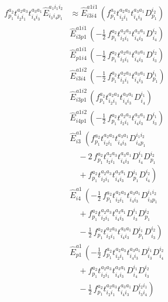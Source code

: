 \documentclass[11pt]{article}
\begin{document}
\begin{align}
f^{a_{2}}_{p_{1}} t^{a_{2}a_{3}}_{i_{2}i_{1}} t^{a_{3}a_{1}}_{i_{4}i_{3}} \hat{E}^{a_{1}i_{1}i_{2}}_{i_{3}i_{4}p_{1}} &\approx \hat{E}^{a1i1}_{i3i4}\,\left(f^{a_{2}}_{p_{1}} t^{a_{2}a_{3}}_{i_{2}i_{1}} t^{a_{3}a_{1}}_{i_{4}i_{3}} D^{i_{2}}_{p_{1}} \right) \\
&\hat{E}^{a1i1}_{i3p1}\,\left(- \tfrac{1}{2}\, f^{a_{2}}_{p_{1}} t^{a_{2}a_{3}}_{i_{2}i_{1}} t^{a_{3}a_{1}}_{i_{4}i_{3}} D^{i_{2}}_{i_{4}} \right) \\
&\hat{E}^{a1i1}_{p1i4}\,\left(- \tfrac{1}{2}\, f^{a_{2}}_{p_{1}} t^{a_{2}a_{3}}_{i_{2}i_{1}} t^{a_{3}a_{1}}_{i_{4}i_{3}} D^{i_{2}}_{i_{3}} \right) \\
&\hat{E}^{a1i2}_{i3i4}\,\left(- \tfrac{1}{2}\, f^{a_{2}}_{p_{1}} t^{a_{2}a_{3}}_{i_{2}i_{1}} t^{a_{3}a_{1}}_{i_{4}i_{3}} D^{i_{1}}_{p_{1}} \right) \\
&\hat{E}^{a1i2}_{i3p1}\,\left(f^{a_{2}}_{p_{1}} t^{a_{2}a_{3}}_{i_{2}i_{1}} t^{a_{3}a_{1}}_{i_{4}i_{3}} D^{i_{1}}_{i_{4}} \right) \\
&\hat{E}^{a1i2}_{i4p1}\,\left(- \tfrac{1}{2}\, f^{a_{2}}_{p_{1}} t^{a_{2}a_{3}}_{i_{2}i_{1}} t^{a_{3}a_{1}}_{i_{4}i_{3}} D^{i_{1}}_{i_{3}} \right) \\
&\hat{E}^{a1}_{i3}\,\left(f^{a_{2}}_{p_{1}} t^{a_{2}a_{3}}_{i_{2}i_{1}} t^{a_{3}a_{1}}_{i_{4}i_{3}} D^{i_{1}i_{2}}_{i_{4}p_{1}} \right. \\
&\left.\quad - 2\, f^{a_{2}}_{p_{1}} t^{a_{2}a_{3}}_{i_{2}i_{1}} t^{a_{3}a_{1}}_{i_{4}i_{3}} D^{i_{1}}_{i_{4}} D^{i_{2}}_{p_{1}} \right. \\
&\left.\quad + f^{a_{2}}_{p_{1}} t^{a_{2}a_{3}}_{i_{2}i_{1}} t^{a_{3}a_{1}}_{i_{4}i_{3}} D^{i_{1}}_{p_{1}} D^{i_{2}}_{i_{4}} \right) \\
&\hat{E}^{a1}_{i4}\,\left(- \tfrac{1}{2}\, f^{a_{2}}_{p_{1}} t^{a_{2}a_{3}}_{i_{2}i_{1}} t^{a_{3}a_{1}}_{i_{4}i_{3}} D^{i_{1}i_{2}}_{i_{3}p_{1}} \right. \\
&\left.\quad + f^{a_{2}}_{p_{1}} t^{a_{2}a_{3}}_{i_{2}i_{1}} t^{a_{3}a_{1}}_{i_{4}i_{3}} D^{i_{1}}_{i_{3}} D^{i_{2}}_{p_{1}} \right. \\
&\left.\quad - \tfrac{1}{2}\, f^{a_{2}}_{p_{1}} t^{a_{2}a_{3}}_{i_{2}i_{1}} t^{a_{3}a_{1}}_{i_{4}i_{3}} D^{i_{1}}_{p_{1}} D^{i_{2}}_{i_{3}} \right) \\
&\hat{E}^{a1}_{p1}\,\left(- \tfrac{1}{2}\, f^{a_{2}}_{p_{1}} t^{a_{2}a_{3}}_{i_{2}i_{1}} t^{a_{3}a_{1}}_{i_{4}i_{3}} D^{i_{1}}_{i_{3}} D^{i_{2}}_{i_{4}} \right. \\
&\left.\quad + f^{a_{2}}_{p_{1}} t^{a_{2}a_{3}}_{i_{2}i_{1}} t^{a_{3}a_{1}}_{i_{4}i_{3}} D^{i_{1}}_{i_{4}} D^{i_{2}}_{i_{3}} \right. \\
&\left.\quad - \tfrac{1}{2}\, f^{a_{2}}_{p_{1}} t^{a_{2}a_{3}}_{i_{2}i_{1}} t^{a_{3}a_{1}}_{i_{4}i_{3}} D^{i_{2}i_{1}}_{i_{3}i_{4}} \right)
\end{align}
\end{document}
